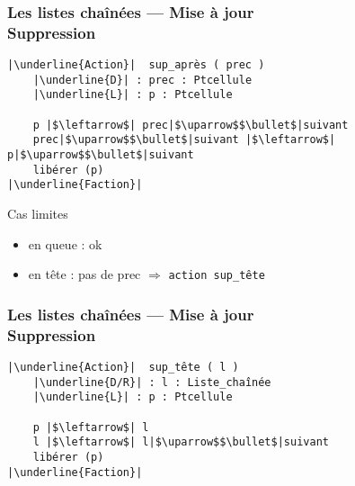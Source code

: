 \documentclass[table,handout,tikz,12pt,svgnames]{beamer}
\begin{document}
\begin{frame}[fragile=singleslide]
	\frametitle{Les listes chaînées --- Mise à jour \\\normalsize Suppression}
	\vspace{-0.7cm}
	\begin{block}{} %
		\begin{verbatim}
|\underline{Action}|  sup_après ( prec )
	|\underline{D}| : prec : Ptcellule
	|\underline{L}| : p : Ptcellule

	p |$\leftarrow$| prec|$\uparrow$$\bullet$|suivant
	prec|$\uparrow$$\bullet$|suivant |$\leftarrow$| p|$\uparrow$$\bullet$|suivant
	libérer (p)
|\underline{Faction}|
		\end{verbatim}
	\end{block}
	\begin{block}{Cas limites}\end{block}
		\vspace{-0.6cm}
		\begin{itemize}
			\item en queue : ok
			\item en tête : pas de prec $\Rightarrow$ \texttt{action sup\_tête}
		\end{itemize}
\end{frame}


\begin{frame}[fragile=singleslide]
	\frametitle{Les listes chaînées --- Mise à jour \\\normalsize Suppression}
	\vspace{-0.7cm}
	\begin{block}{} %
		\begin{verbatim}
|\underline{Action}|  sup_tête ( l )
	|\underline{D/R}| : l : Liste_chaînée
	|\underline{L}| : p : Ptcellule

	p |$\leftarrow$| l
	l |$\leftarrow$| l|$\uparrow$$\bullet$|suivant
	libérer (p)
|\underline{Faction}|
		\end{verbatim}
	\end{block}
\end{frame}


\end{document}
